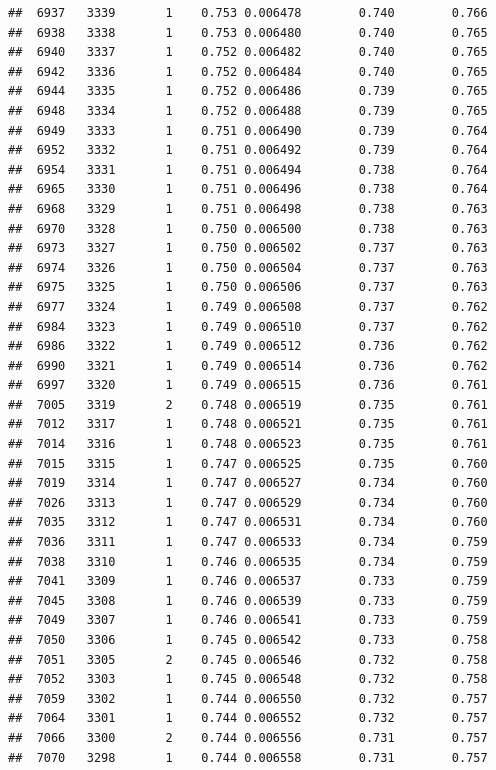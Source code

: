 \documentclass[
]{book}
\begin{document}
\begin{verbatim}
##  6937   3339       1    0.753 0.006478        0.740        0.766
##  6938   3338       1    0.753 0.006480        0.740        0.765
##  6940   3337       1    0.752 0.006482        0.740        0.765
##  6942   3336       1    0.752 0.006484        0.740        0.765
##  6944   3335       1    0.752 0.006486        0.739        0.765
##  6948   3334       1    0.752 0.006488        0.739        0.765
##  6949   3333       1    0.751 0.006490        0.739        0.764
##  6952   3332       1    0.751 0.006492        0.739        0.764
##  6954   3331       1    0.751 0.006494        0.738        0.764
##  6965   3330       1    0.751 0.006496        0.738        0.764
##  6968   3329       1    0.751 0.006498        0.738        0.763
##  6970   3328       1    0.750 0.006500        0.738        0.763
##  6973   3327       1    0.750 0.006502        0.737        0.763
##  6974   3326       1    0.750 0.006504        0.737        0.763
##  6975   3325       1    0.750 0.006506        0.737        0.763
##  6977   3324       1    0.749 0.006508        0.737        0.762
##  6984   3323       1    0.749 0.006510        0.737        0.762
##  6986   3322       1    0.749 0.006512        0.736        0.762
##  6990   3321       1    0.749 0.006514        0.736        0.762
##  6997   3320       1    0.749 0.006515        0.736        0.761
##  7005   3319       2    0.748 0.006519        0.735        0.761
##  7012   3317       1    0.748 0.006521        0.735        0.761
##  7014   3316       1    0.748 0.006523        0.735        0.761
##  7015   3315       1    0.747 0.006525        0.735        0.760
##  7019   3314       1    0.747 0.006527        0.734        0.760
##  7026   3313       1    0.747 0.006529        0.734        0.760
##  7035   3312       1    0.747 0.006531        0.734        0.760
##  7036   3311       1    0.747 0.006533        0.734        0.759
##  7038   3310       1    0.746 0.006535        0.734        0.759
##  7041   3309       1    0.746 0.006537        0.733        0.759
##  7045   3308       1    0.746 0.006539        0.733        0.759
##  7049   3307       1    0.746 0.006541        0.733        0.759
##  7050   3306       1    0.745 0.006542        0.733        0.758
##  7051   3305       2    0.745 0.006546        0.732        0.758
##  7052   3303       1    0.745 0.006548        0.732        0.758
##  7059   3302       1    0.744 0.006550        0.732        0.757
##  7064   3301       1    0.744 0.006552        0.732        0.757
##  7066   3300       2    0.744 0.006556        0.731        0.757
##  7070   3298       1    0.744 0.006558        0.731        0.757

\end{verbatim}
\end{document}
